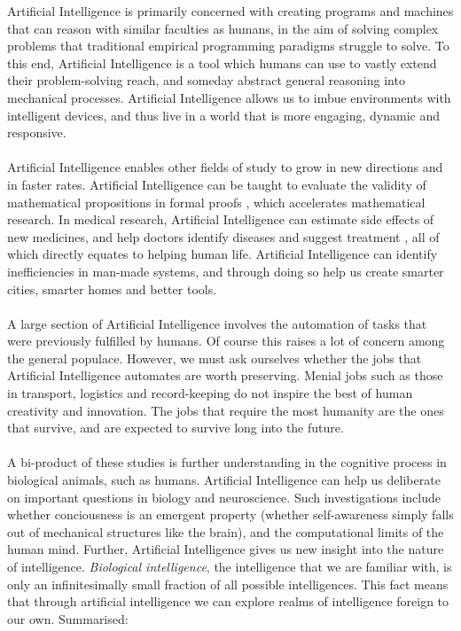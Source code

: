 \documentclass[10pt,a4paper]{article}
\begin{document}
				Artificial Intelligence is primarily concerned with creating programs and machines that can reason with similar faculties as humans, in the aim of solving complex problems that traditional empirical programming paradigms struggle to solve. To this end, Artificial Intelligence is a tool which humans can use to vastly extend their problem-solving reach, and someday abstract general reasoning into mechanical processes. Artificial Intelligence allows us to imbue environments with intelligent devices, and thus live in a world that is more engaging, dynamic and responsive.
				\\\\
				Artificial Intelligence enables other fields of study to grow in new directions and in faster rates. Artificial Intelligence can be taught to evaluate the validity of mathematical propositions in formal proofs \cite{atp}, which accelerates mathematical research. In medical research, Artificial Intelligence can estimate side effects of new medicines, and help doctors identify diseases and suggest treatment \cite{cancer}, all of which directly equates to helping human life. Artificial Intelligence can identify inefficiencies in man-made systems, and through doing so help us create smarter cities, smarter homes and better tools.
				\\\\
				A large section of Artificial Intelligence involves the automation of tasks that were previously fulfilled by humans. Of course this raises a lot of concern among the general populace. However, we must ask ourselves whether the jobs that Artificial Intelligence automates are worth preserving. Menial jobs such as those in transport, logistics and record-keeping do not inspire the best of human creativity and innovation. The jobs that require the most humanity are the ones that survive, and are expected to survive long into the future.
				\\\\
				A bi-product of these studies is further understanding in the cognitive process in biological animals, such as humans. Artificial Intelligence can help us deliberate on important questions in biology and neuroscience. Such investigations include whether conciousness is an emergent property (whether self-awareness simply falls out of mechanical structures like the brain), and the computational limits of the human mind. Further, Artificial Intelligence gives us new insight into the nature of intelligence. \textsl{Biological intelligence}, the intelligence that we are familiar with, is only an infinitesimally small fraction of all possible intelligences. This fact means that through artificial intelligence we can explore realms of intelligence foreign to our own. Summarised:
		
\end{document}

